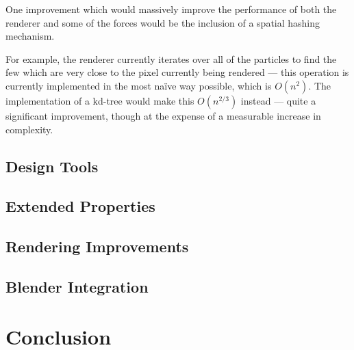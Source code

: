 \documentclass{acmsiggraph}
\begin{document}
One improvement which would massively improve the performance of both the renderer and some of the forces would be the inclusion of a spatial hashing mechanism.

For example, the renderer currently iterates over all of the particles to find the few which are very close to the pixel currently being rendered --- this operation is currently implemented in the most na\"{i}ve way possible, which is $O(n^2)$. The implementation of a kd-tree would make this $O(n^{2/3})$ instead --- quite a significant improvement, though at the expense of a measurable increase in complexity.

\subsection{Design Tools}

\subsection{Extended Properties}

\subsection{Rendering Improvements}

\subsection{Blender Integration}

\section{Conclusion}


\nocite{*}

\end{document}

